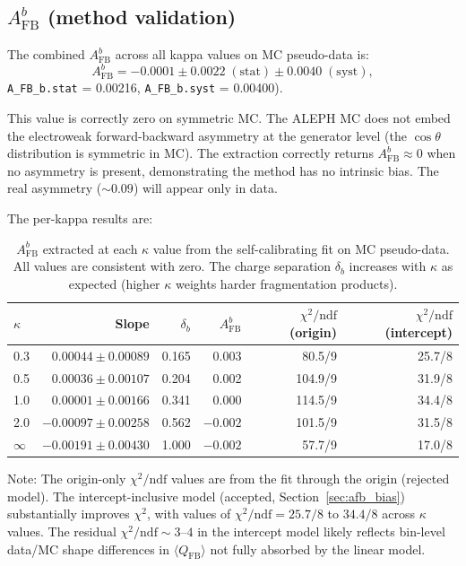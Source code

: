 \documentclass[11pt,a4paper]{article}
\begin{document}
\subsection{$A_\mathrm{FB}^b$ (method validation)}
\label{sec:result_afb}

The combined $A_\mathrm{FB}^b$ across all kappa values on MC pseudo-data is:
\begin{equation}
A_\mathrm{FB}^b = -0.0001 \pm 0.0022\;\mathrm{(stat)} \pm 0.0040\;\mathrm{(syst)},
\label{eq:afb_result}
\end{equation}
\texttt{A\_FB\_b.stat} = 0.00216, \texttt{A\_FB\_b.syst} = 0.00400).

This value is correctly zero on symmetric MC. The ALEPH MC does not embed the
electroweak forward-backward asymmetry at the generator level (the $\cos\theta$
distribution is symmetric in MC). The extraction correctly returns
$A_\mathrm{FB}^b \approx 0$ when no asymmetry is present, demonstrating the method
has no intrinsic bias. The real asymmetry ($\sim 0.09$) will appear only in data.

The per-kappa results are:

\begin{table}[htbp]
\centering
\caption{$A_\mathrm{FB}^b$ extracted at each $\kappa$ value from the self-calibrating
fit on MC pseudo-data. All values are consistent with zero. The charge separation
$\delta_b$ increases with $\kappa$ as expected (higher $\kappa$ weights harder
fragmentation products).}
\label{tab:afb_perkappa}
\begin{tabular}{lrrrrr}
\toprule
$\kappa$ & Slope & $\delta_b$ & $A_\mathrm{FB}^b$ & $\chi^2/\mathrm{ndf}$ (origin) & $\chi^2/\mathrm{ndf}$ (intercept) \\
\midrule
0.3 & $0.00044 \pm 0.00089$ & 0.165 & 0.003 & 80.5/9 & 25.7/8 \\
0.5 & $0.00036 \pm 0.00107$ & 0.204 & 0.002 & 104.9/9 & 31.9/8 \\
1.0 & $0.00001 \pm 0.00166$ & 0.341 & 0.000 & 114.5/9 & 34.4/8 \\
2.0 & $-0.00097 \pm 0.00258$ & 0.562 & $-0.002$ & 101.5/9 & 31.5/8 \\
$\infty$ & $-0.00191 \pm 0.00430$ & 1.000 & $-0.002$ & 57.7/9 & 17.0/8 \\
\bottomrule
\end{tabular}
\end{table}

Note: The origin-only $\chi^2/\mathrm{ndf}$ values are from the fit through the origin
(rejected model). The intercept-inclusive model (accepted, Section~\ref{sec:afb_bias})
substantially improves $\chi^2$, with values of $\chi^2/\mathrm{ndf} = 25.7/8$ to
$34.4/8$ across $\kappa$ values. The residual $\chi^2/\mathrm{ndf} \sim 3$--$4$ in the
intercept model likely reflects bin-level data/MC shape differences in
$\langle Q_\mathrm{FB} \rangle$ not fully absorbed by the linear model.
\end{document}
